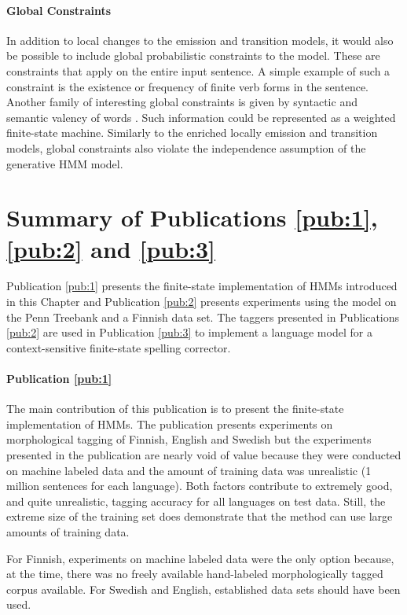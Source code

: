 \paragraph{Global Constraints} In addition to local changes to the
emission and transition models, it would also be possible to include
global probabilistic constraints to the model. These are constraints
that apply on the entire input sentence. A simple example of such a
constraint is the existence or frequency of finite verb forms in the
sentence. Another family of interesting global constraints is given by
syntactic and semantic valency of words \citep{Baker1998}. Such
information could be represented as a weighted finite-state
machine. Similarly to the enriched locally emission and transition
models, global constraints also violate the independence assumption of
the generative HMM model.

\section{Summary of Publications \ref{pub:1}, \ref{pub:2} and \ref{pub:3}}

Publication \ref{pub:1} presents the finite-state implementation of
HMMs introduced in this Chapter and Publication \ref{pub:2} presents
experiments using the model on the Penn Treebank and a Finnish data
set. The taggers presented in Publications \ref{pub:2} are used in
Publication \ref{pub:3} to implement a language model for a
context-sensitive finite-state spelling corrector.

\paragraph{Publication \ref{pub:1}} The main contribution of this
publication is to present the finite-state implementation of HMMs. The
publication presents experiments on morphological tagging of Finnish,
English and Swedish but the experiments presented in the publication
are nearly void of value because they were conducted on machine
labeled data and the amount of training data was unrealistic (1
million sentences for each language). Both factors contribute to
extremely good, and quite unrealistic, tagging accuracy for all
languages on test data. Still, the extreme size of the training set
does demonstrate that the method can use large amounts of training
data.

For Finnish, experiments on machine labeled data were the only option
because, at the time, there was no freely available hand-labeled
morphologically tagged corpus available. For Swedish and English,
established data sets should have been used.


